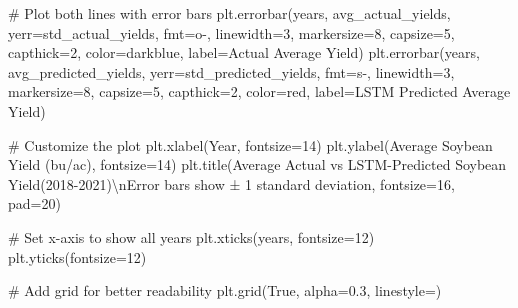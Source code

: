 \documentclass[
  letterpaper,
  DIV=11,
  numbers=noendperiod]{scrreprt}
\newenvironment{Shaded}{\begin{snugshade}}{\end{snugshade}}
\newcommand{\CharTok}[1]{\textcolor[rgb]{0.13,0.47,0.30}{#1}}
\newcommand{\CommentTok}[1]{\textcolor[rgb]{0.37,0.37,0.37}{#1}}
\newcommand{\DecValTok}[1]{\textcolor[rgb]{0.68,0.00,0.00}{#1}}
\newcommand{\FloatTok}[1]{\textcolor[rgb]{0.68,0.00,0.00}{#1}}
\newcommand{\NormalTok}[1]{\textcolor[rgb]{0.00,0.23,0.31}{#1}}
\newcommand{\OperatorTok}[1]{\textcolor[rgb]{0.37,0.37,0.37}{#1}}
\newcommand{\StringTok}[1]{\textcolor[rgb]{0.13,0.47,0.30}{#1}}
\newcommand{\VariableTok}[1]{\textcolor[rgb]{0.07,0.07,0.07}{#1}}
\begin{document}
\begin{Shaded}
\begin{Highlighting}[]
    \CommentTok{\# Plot both lines with error bars}
\NormalTok{    plt.errorbar(years, avg\_actual\_yields, yerr}\OperatorTok{=}\NormalTok{std\_actual\_yields,}
\NormalTok{                 fmt}\OperatorTok{=}\StringTok{\textquotesingle{}o{-}\textquotesingle{}}\NormalTok{, linewidth}\OperatorTok{=}\DecValTok{3}\NormalTok{, markersize}\OperatorTok{=}\DecValTok{8}\NormalTok{, capsize}\OperatorTok{=}\DecValTok{5}\NormalTok{, capthick}\OperatorTok{=}\DecValTok{2}\NormalTok{,}
\NormalTok{                 color}\OperatorTok{=}\StringTok{\textquotesingle{}darkblue\textquotesingle{}}\NormalTok{, label}\OperatorTok{=}\StringTok{\textquotesingle{}Actual Average Yield\textquotesingle{}}\NormalTok{)}
\NormalTok{    plt.errorbar(years, avg\_predicted\_yields, yerr}\OperatorTok{=}\NormalTok{std\_predicted\_yields,}
\NormalTok{                 fmt}\OperatorTok{=}\StringTok{\textquotesingle{}s{-}\textquotesingle{}}\NormalTok{, linewidth}\OperatorTok{=}\DecValTok{3}\NormalTok{, markersize}\OperatorTok{=}\DecValTok{8}\NormalTok{, capsize}\OperatorTok{=}\DecValTok{5}\NormalTok{, capthick}\OperatorTok{=}\DecValTok{2}\NormalTok{,}
\NormalTok{                 color}\OperatorTok{=}\StringTok{\textquotesingle{}red\textquotesingle{}}\NormalTok{, label}\OperatorTok{=}\StringTok{\textquotesingle{}LSTM Predicted Average Yield\textquotesingle{}}\NormalTok{)}

    \CommentTok{\# Customize the plot}
\NormalTok{    plt.xlabel(}\StringTok{\textquotesingle{}Year\textquotesingle{}}\NormalTok{, fontsize}\OperatorTok{=}\DecValTok{14}\NormalTok{)}
\NormalTok{    plt.ylabel(}\StringTok{\textquotesingle{}Average Soybean Yield (bu/ac)\textquotesingle{}}\NormalTok{, fontsize}\OperatorTok{=}\DecValTok{14}\NormalTok{)}
\NormalTok{    plt.title(}\StringTok{\textquotesingle{}Average Actual vs LSTM{-}Predicted Soybean Yield(2018{-}2021)}\CharTok{\textbackslash{}n}\StringTok{Error bars show ± 1 standard deviation\textquotesingle{}}\NormalTok{,}
\NormalTok{              fontsize}\OperatorTok{=}\DecValTok{16}\NormalTok{, pad}\OperatorTok{=}\DecValTok{20}\NormalTok{)}

    \CommentTok{\# Set x{-}axis to show all years}
\NormalTok{    plt.xticks(years, fontsize}\OperatorTok{=}\DecValTok{12}\NormalTok{)}
\NormalTok{    plt.yticks(fontsize}\OperatorTok{=}\DecValTok{12}\NormalTok{)}

    \CommentTok{\# Add grid for better readability}
\NormalTok{    plt.grid(}\VariableTok{True}\NormalTok{, alpha}\OperatorTok{=}\FloatTok{0.3}\NormalTok{, linestyle}\OperatorTok{=}\StringTok{\textquotesingle{}{-}{-}\textquotesingle{}}\NormalTok{)}


\end{Highlighting}
\end{Shaded}
\end{document}
